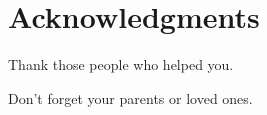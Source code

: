 
\chapter{Acknowledgments}

Thank those people who helped you. 

Don't forget your parents or loved ones.
\endinput
Any text after an \endinput is ignored.

You may wish to acknowledge your funding sources.

NSERC CGS-M scholarship.



Julieta Martinez for the discussions.
